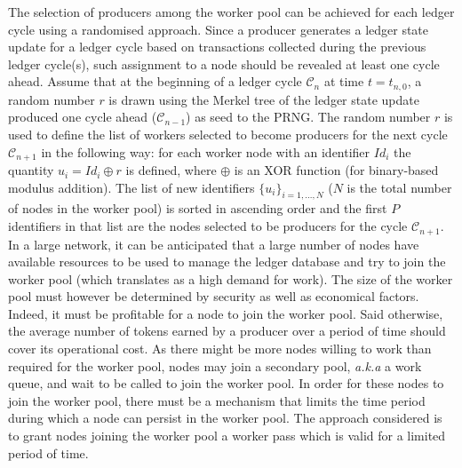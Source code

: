 
The selection of producers among the worker pool can be achieved for each ledger cycle using a randomised approach. Since a producer generates a ledger state update for a ledger cycle based on transactions collected during the previous ledger cycle(s), such assignment to a node should be revealed at least one cycle ahead. Assume that at the beginning of a ledger cycle $\mathcal{C}_n$ at time $t = t_{n,0}$, a random number $r$ is drawn using the Merkel tree of the ledger state update produced one cycle ahead ($\mathcal{C}_{n-1}$) as seed to the PRNG. The random number $r$ is used to define the list of workers selected to become producers for the next cycle $\mathcal{C}_{n+1}$ in the following way: for each worker node with an identifier $Id_i$ the quantity $u_i = Id_i \oplus r$ is defined, where $\oplus$ is an XOR function (for binary-based modulus addition). The list of new identifiers $\{u_i \}_{i=1,...,N}$ ($N$ is the total number of nodes in the worker pool) is sorted in ascending order and the first $P$ identifiers in that list are the nodes selected to be producers for the cycle $\mathcal{C}_{n+1}$.\\


In a large network, it can be anticipated that a large number of nodes have available resources to be used to manage the ledger database and try to join the worker pool (which translates as a high demand for work). The size of the worker pool must however be determined by security as well as economical factors. Indeed, it must be profitable for a node to join the worker pool. Said otherwise, the average number of tokens earned by a producer over a period of time should cover its operational cost. As there might be more nodes willing to work than required for the worker pool, nodes may join a secondary pool, \textit{a.k.a} a work queue, and wait to be called to join the worker pool. In order for these nodes to join the worker pool, there must be a mechanism that limits the time period during which a node can persist in the worker pool. The approach considered is to grant nodes joining the worker pool a worker pass which is valid for a limited period of time. \\

